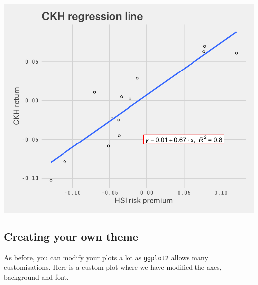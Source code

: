 \documentclass[]{article}
\begin{document}
\begin{center}\includegraphics{11_Linear_Regression_Plot_pdf/lr_17-1} \end{center}

\subsection{Creating your own theme}\label{creating-your-own-theme}

As before, you can modify your plots a lot as \texttt{ggplot2} allows
many customisations. Here is a custom plot where we have modified the
axes, background and font.
\end{document}
